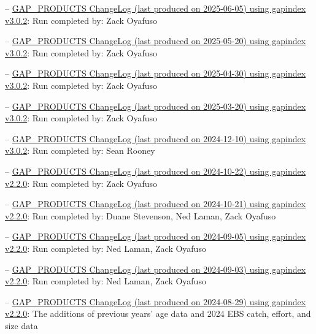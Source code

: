 \documentclass[
  letterpaper,
  oneside,
  open=any]{scrbook}
\begin{document}
--
\href{https://raw.githubusercontent.com/afsc-gap-products/gap_products/main/content/intro-news/2025-06-05.txt}{GAP\_PRODUCTS
ChangeLog (last produced on 2025-06-05) using gapindex v3.0.2}: Run
completed by: Zack Oyafuso

--
\href{https://raw.githubusercontent.com/afsc-gap-products/gap_products/main/content/intro-news/2025-05-20.txt}{GAP\_PRODUCTS
ChangeLog (last produced on 2025-05-20) using gapindex v3.0.2}: Run
completed by: Zack Oyafuso

--
\href{https://raw.githubusercontent.com/afsc-gap-products/gap_products/main/content/intro-news/2025-04-30.txt}{GAP\_PRODUCTS
ChangeLog (last produced on 2025-04-30) using gapindex v3.0.2}: Run
completed by: Zack Oyafuso

--
\href{https://raw.githubusercontent.com/afsc-gap-products/gap_products/main/content/intro-news/2025-03-20.txt}{GAP\_PRODUCTS
ChangeLog (last produced on 2025-03-20) using gapindex v3.0.2}: Run
completed by: Zack Oyafuso

--
\href{https://raw.githubusercontent.com/afsc-gap-products/gap_products/main/content/intro-news/2024-12-10.txt}{GAP\_PRODUCTS
ChangeLog (last produced on 2024-12-10) using gapindex v3.0.2}: Run
completed by: Sean Rooney

--
\href{https://raw.githubusercontent.com/afsc-gap-products/gap_products/main/content/intro-news/2024-10-22.txt}{GAP\_PRODUCTS
ChangeLog (last produced on 2024-10-22) using gapindex v2.2.0}: Run
completed by: Zack Oyafuso

--
\href{https://raw.githubusercontent.com/afsc-gap-products/gap_products/main/content/intro-news/2024-10-21.txt}{GAP\_PRODUCTS
ChangeLog (last produced on 2024-10-21) using gapindex v2.2.0}: Run
completed by: Duane Stevenson, Ned Laman, Zack Oyafuso

--
\href{https://raw.githubusercontent.com/afsc-gap-products/gap_products/main/content/intro-news/2024-09-05.txt}{GAP\_PRODUCTS
ChangeLog (last produced on 2024-09-05) using gapindex v2.2.0}: Run
completed by: Ned Laman, Zack Oyafuso

--
\href{https://raw.githubusercontent.com/afsc-gap-products/gap_products/main/content/intro-news/2024-09-03.txt}{GAP\_PRODUCTS
ChangeLog (last produced on 2024-09-03) using gapindex v2.2.0}: Run
completed by: Ned Laman, Zack Oyafuso

--
\href{https://raw.githubusercontent.com/afsc-gap-products/gap_products/main/content/intro-news/2024-08-29.txt}{GAP\_PRODUCTS
ChangeLog (last produced on 2024-08-29) using gapindex v2.2.0}: The
additions of previous years' age data and 2024 EBS catch, effort, and
size data
\end{document}
